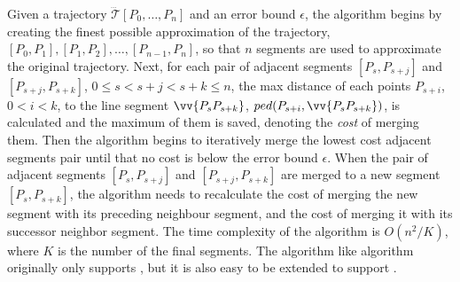 Given a trajectory $\dddot{\mathcal{T}}[P_0, \ldots, P_n]$ and an error bound $\epsilon$,
the algorithm begins by creating the finest possible approximation of the trajectory, \ie $[P_0, P_1], [P_1, P_2], \ldots,[P_{n-1}, P_n]$, so that $n$ segments are used to approximate the original trajectory.
Next, for each pair of adjacent segments $[P_{s}, P_{s+j}]$ and $[P_{s+j}, P_{s+k}]$, $0\le s<s+j < s+k \le n$,
the max distance of each points $P_{s+i}$, $0<i<k$, to the line segment $\vv{P_sP_{s+k}}$, \ie $ped(P_{s+i}, \vv{P_sP_{s+k}})$, is calculated and the maximum of them is saved, denoting the \emph{cost} of merging them.
Then the algorithm begins to iteratively merge the lowest cost adjacent segments pair
until that no cost is below the error bound $\epsilon$.
When the pair of adjacent segments $[P_{s}, P_{s+j}]$ and $[P_{s+j}, P_{s+k}]$ are merged to a new segment $[P_{s}, P_{s+k}]$, the algorithm needs to recalculate the cost of merging the new segment with its preceding neighbour segment, and the cost of merging it with its successor neighbor segment.
%
The time complexity of the algorithm is $O(n^2/K)$, where $K$ is the number of the final segments.
The \tpa algorithm like \dpa algorithm originally only supports \ped, but it is also easy to be extended to support \sed.

